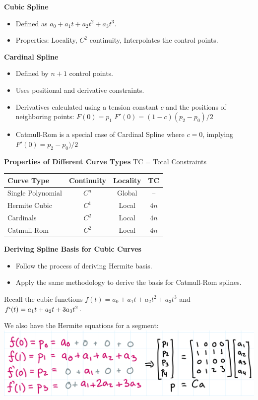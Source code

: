 \documentclass[letterpaper, 8pt]{extarticle}
\begin{document}
\begin{multicols*}{4}
\textbf{Cubic Spline}
\begin{itemize}
    \item Defined as $a_0 + a_1t + a_2t^2 + a_3t^3$.
    \item Properties: Locality, $C^2$ continuity, Interpolates the control points.
\end{itemize}

\textbf{Cardinal Spline}
\begin{itemize}
    \item Defined by $n+1$ control points.
    \item Uses positional and derivative constraints.
    \item Derivatives calculated using a tension constant $c$ and the positions of neighboring points: $F(0) = p_1$ $F'(0) = (1-c)(p_2 - p_0)/2$
    \item Catmull-Rom is a special case of Cardinal Spline where $c = 0$, implying $ F'(0) = p_2 - p_0)/2$
\end{itemize}

\textbf{Properties of Different Curve Types}
TC = Total Constraints
\begin{center}
\begin{tabular}{|l|c|c|c|}
    \hline
    Curve Type & Continuity & Locality &  TC \\
    \hline
    Single Polynomial  & $C^n$ & Global & -- \\
    Hermite Cubic  & $C^1$ & Local & $4n$ \\
    Cardinals & $C^2$ & Local & $4n$ \\
    Catmull-Rom  & $C^2$ & Local & $4n$ \\
    \hline
\end{tabular}
\end{center}

\textbf{Deriving Spline Basis for Cubic Curves}
\begin{itemize}
    \item Follow the process of deriving Hermite basis.
    \item Apply the same methodology to derive the basis for Catmull-Rom splines.
\end{itemize}

Recall the cubic functions
$f(t) = a_0 + a_1t + a_2t^2 + a_3t^3$ and
$f`(t) = a_1t + a_2t + 3a_3t^2$.

We also have the Hermite equations for a segment:
\includegraphics[width=0.8\linewidth]{
curve-basis-soe.png}


\end{multicols*}
\end{document}
